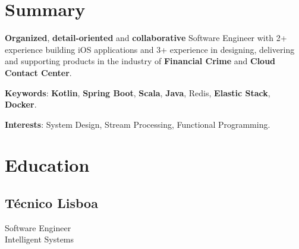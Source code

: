 \documentclass[letterpaper]{deedy-resume} %
\begin{document}
\begin{minipage}[t]{0.33\textwidth} %


\section{Summary}

\textbf{Organized}, \textbf{detail-oriented} and \textbf{collaborative} Software Engineer with 2+ experience building iOS applications and 3+ experience in designing, delivering and supporting products in the industry of \textbf{Financial Crime} and \textbf{Cloud Contact Center}.

\vspace{\topsep}

\textbf{Keywords}: \textbf{Kotlin}, \textbf{Spring Boot}, \textbf{Scala}, \textbf{Java}, Redis, \textbf{Elastic Stack}, \textbf{Docker}.

\vspace{\topsep}

\textbf{Interests}: System Design, Stream Processing, Functional Programming.

\section{Education} 

\subsection{Técnico Lisboa}

Software Engineer\\
Intelligent Systems \\
\vspace{\topsep}
\vspace{\topsep}

\sectionspace %


\vspace{\topsep}


\end{minipage}
\end{document}
